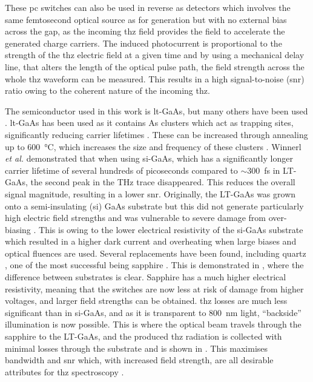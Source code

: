 These \acrshort{pc} switches can also be used in reverse as detectors which involves the same femtosecond optical source as for generation but with no external bias across the gap, as the incoming \acrshort{thz} field provides the field to accelerate the generated charge carriers. The induced photocurrent is proportional to the strength of the \acrshort{thz} electric field at a given time and by using a mechanical delay line, that alters the length of the optical pulse path, the field strength across the whole \acrshort{thz} waveform can be measured. This results in a high signal-to-noise (\acrshort{snr}) ratio owing to the coherent nature of the incoming \acrshort{thz}.

The semiconductor used in this work is \acrfull{lt}-GaAs, but many others have been used \DIFdelbegin \DIFdel{~}\DIFdelend \cite{Burford2017, Bacon2021, Murakumo2016, Dietz2013, Gu2002, Bertulis2006, Collier2016}. \acrshort{lt}\nobreakdash-GaAs has been used as it contains As clusters which act as trapping sites, significantly reducing carrier lifetimes \DIFdelbegin \DIFdel{~}\DIFdelend \cite{Segschneider1997}. These can be increased through annealing up to \SI{600}{\degreeCelsius}, which increases the size and frequency of these clusters \DIFdelbegin \DIFdel{~}\DIFdelend \cite{Gregory2003}. Winnerl \textit{et al.} \DIFdelbegin \DIFdel{~}\DIFdelend \cite{Winnerl2008} demonstrated that when using \acrshort{si}\nobreakdash-GaAs, which has a significantly longer carrier lifetime of several hundreds of picoseconds compared to \(\sim\)\SI{300}{\femto\second} in LT-GaAs, the second peak in the THz trace disappeared. This reduces the overall signal magnitude, resulting in a lower \acrshort{snr}.
Originally, the LT\nobreakdash-GaAs was grown onto a semi\nobreakdash-insulating (\acrshort{si}) GaAs substrate but this did not generate particularly high electric field strengths and was vulnerable to severe damage from over\nobreakdash-biasing \DIFdelbegin \DIFdel{~}\DIFdelend \cite{Bacon2017}. This is owing to the lower electrical resistivity of the \acrshort{si}-GaAs substrate which resulted in a higher dark current and overheating when large biases and optical fluences are used. Several replacements have been found, including quartz \DIFdelbegin \DIFdel{~}\DIFdelend \cite{Bacon2017}, one of the most successful being sapphire \DIFdelbegin \DIFdel{~}\DIFdelend \cite{Russell2013, Bacon2021}. This is demonstrated in , where the difference between substrates is clear. Sapphire has a much higher electrical resistivity, meaning that the switches are now less at risk of damage from higher voltages, and larger field strengths can be obtained. \acrshort{thz} losses are much less significant than in \acrshort{si}\nobreakdash-GaAs, and as it is transparent to \SI{800}{nm} light, “backside” illumination is now possible. This is where the optical beam travels through the sapphire to the LT\nobreakdash-GaAs, and the produced \acrshort{thz} radiation is collected with minimal losses through the substrate and is shown in . This maximises bandwidth and \acrshort{snr} which, with increased field strength, are all desirable attributes for \acrshort{thz} spectroscopy \DIFdelbegin \DIFdel{~}\DIFdelend \cite{Bacon2017}.

